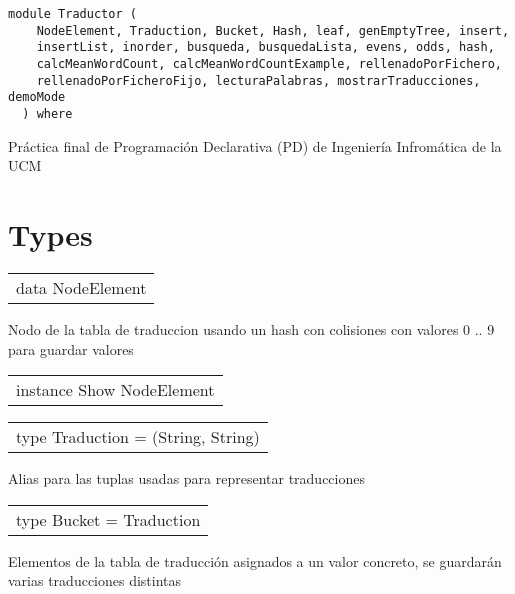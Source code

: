 \label{module:Traductor}
\haddockbeginheader
{\haddockverb\begin{verbatim}
module Traductor (
    NodeElement, Traduction, Bucket, Hash, leaf, genEmptyTree, insert,
    insertList, inorder, busqueda, busquedaLista, evens, odds, hash,
    calcMeanWordCount, calcMeanWordCountExample, rellenadoPorFichero,
    rellenadoPorFicheroFijo, lecturaPalabras, mostrarTraducciones, demoMode
  ) where\end{verbatim}}
\haddockendheader

Práctica final de Programación Declarativa (PD) de Ingeniería Infromática de la UCM\par
\section{Types}
\begin{haddockdesc}
\item[\begin{tabular}{@{}l}
data NodeElement
\end{tabular}]
{\haddockbegindoc
Nodo de la tabla de traduccion usando un hash con colisiones con valores {}0 .. 9{} para guardar valores\par}
\end{haddockdesc}
\begin{haddockdesc}
\item[\begin{tabular}{@{}l}
instance Show NodeElement
\end{tabular}]
\end{haddockdesc}
\begin{haddockdesc}
\item[\begin{tabular}{@{}l}
type Traduction = (String, String)
\end{tabular}]
{\haddockbegindoc
Alias para las tuplas usadas para representar traducciones\par}
\end{haddockdesc}
\begin{haddockdesc}
\item[\begin{tabular}{@{}l}
type Bucket = {\char 91}Traduction{\char 93}
\end{tabular}]
{\haddockbegindoc
Elementos de la tabla de traducción asignados a un valor concreto, se guardarán varias traducciones distintas\par}
\end{haddockdesc}
